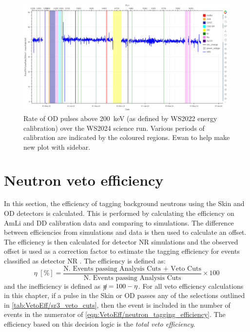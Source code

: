 \begin{figure}[!ht]
	\centering
	\includegraphics[width=\textwidth]{figures/VetoEfficiency/prem_od_stability.png}
	\caption[Rate of OD pulses above 200~keV over the WS2024 science run.]{Rate of OD pulses above 200~keV (as defined by WS2022 energy calibration) over the WS2024 science run. Various periods of calibration are indicated by the coloured regions. {\color{red}Ewan to help make new plot with sidebar.}}
	\label{fig:VetoEff/deadtime_stability_prem}
\end{figure}

\section{Neutron veto efficiency}\label{sec:VetoEff/efficiency}
In this section, the efficiency of tagging background neutrons using the Skin and OD detectors is calculated.
This is performed by calculating the efficiency on AmLi and DD calibration data and comparing to simulations.
The difference between efficiencies from simulations and data is then used to calculate an offset.
The efficiency is then calculated for detector NR simulations and the observed offset is used as a correction factor to estimate the tagging efficiency for events classified as detector NR \cite{LZ:2022ysc,LZ:2024zvo}.
The efficiency is defined as:
\begin{equation}\label{eqn:VetoEff/neutron_tagging_efficiency}
	\eta\;[\%] = \frac{\textrm{N. Events passing Analysis Cuts + Veto Cuts}}{\textrm{N. Events passing Analysis Cuts}} \times 100
\end{equation}
and the inefficiency is defined as $\cancel{\eta}=100-\eta$. For all veto efficiency calculations in this chapter, if a pulse in the Skin or OD passes any of the selections outlined in \autoref{tab:VetoEff/sr3_veto_cuts}, then the event is included in the number of events in the numerator of \autoref{eqn:VetoEff/neutron_tagging_efficiency}. The efficiency based on this decision logic is the \textit{total veto efficiency}.

